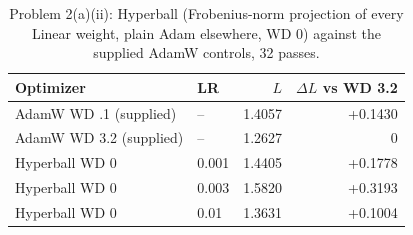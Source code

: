 
\begin{table}[H]\centering\small\caption{Problem 2(a)(ii): Hyperball (Frobenius-norm projection of every Linear weight, plain Adam elsewhere, WD 0) against the supplied AdamW controls, 32 passes.}\label{tab:hb}
\begin{tabular}{llrr}\toprule Optimizer & LR & $L$ & $\Delta L$ vs WD 3.2 \\ \midrule
AdamW WD .1 (supplied) & -- & 1.4057 & +0.1430 \\
AdamW WD 3.2 (supplied) & -- & 1.2627 & 0 \\
Hyperball WD 0 & 0.001 & 1.4405 & +0.1778 \\
Hyperball WD 0 & 0.003 & 1.5820 & +0.3193 \\
Hyperball WD 0 & 0.01 & 1.3631 & +0.1004 \\
\bottomrule\end{tabular}\end{table}

